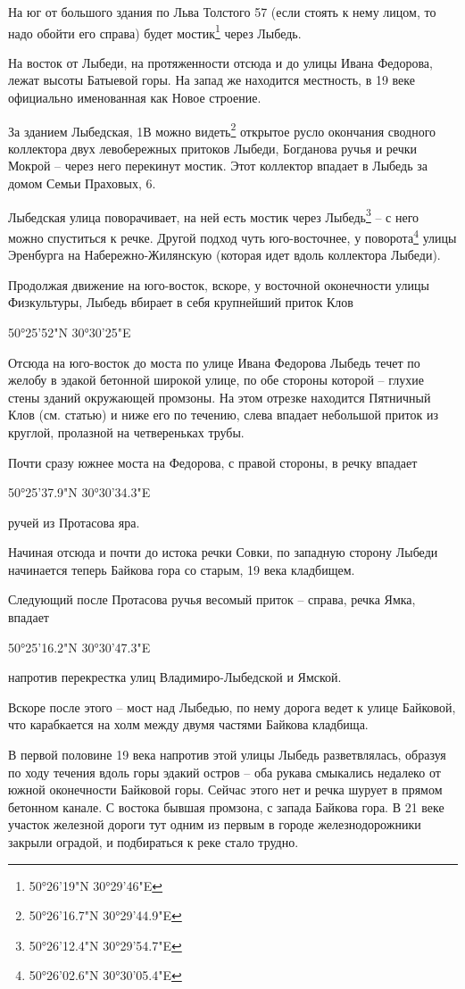 На юг от большого здания по Льва Толстого 57 (если стоять к нему лицом, то надо обойти его справа) будет мостик\footnote{50°26'19"N   30°29'46"E} через Лыбедь.

На восток от Лыбеди, на протяженности отсюда и до улицы Ивана Федорова, лежат высоты Батыевой горы. На запад же находится местность, в 19 веке официально именованная как Новое строение.

За зданием Лыбедская, 1В можно видеть\footnote{50°26'16.7"N 30°29'44.9"E} открытое русло окончания сводного коллектора двух левобережных притоков Лыбеди, Богданова ручья и речки Мокрой – через него перекинут мостик. Этот коллектор впадает в Лыбедь за домом Семьи Праховых, 6.

Лыбедская улица поворачивает, на ней есть мостик через Лыбедь\footnote{50°26'12.4"N 30°29'54.7"E} – с него можно спуститься к речке. Другой подход чуть юго-восто\-чнее, у поворота\footnote{50°26'02.6"N 30°30'05.4"E} улицы Эренбурга на Набе\-режно-Жилянскую (которая идет вдоль коллектора Лыбеди).

Продолжая движение на юго-восток, вскоре, у восточной оконечности улицы Физкультуры, Лыбедь вбирает в себя крупнейший приток Клов

50°25'52"N 30°30'25"E

Отсюда на юго-восток до моста по улице Ивана Федорова Лыбедь течет по желобу в эдакой бетонной широкой улице, по обе стороны которой – глухие стены зданий окружающей промзоны. На этом отрезке находится Пятничный Клов (см. статью) и ниже его по течению, слева впадает небольшой приток из круглой, пролазной на четвереньках трубы.

Почти сразу южнее моста на Федорова, с правой стороны, в речку впадает

50°25'37.9"N 30°30'34.3"E

ручей из Протасова яра.

Начиная отсюда и почти до истока речки Совки, по западную сторону Лыбеди начинается теперь Байкова гора со старым, 19 века кладбищем.

Следующий после Протасова ручья весомый приток – справа, речка Ямка, впадает

50°25'16.2"N 30°30'47.3"E 

напротив перекрестка улиц Владимиро-Лыб\-едской и Ямской.

Вскоре после этого – мост над Лыбедью, по нему дорога ведет к улице Байковой, что карабкается на холм между двумя частями Байкова кладбища.

В первой половине 19 века напротив этой улицы Лыбедь разветвлялась, образуя по ходу течения вдоль горы эдакий остров – оба рукава смыкались недалеко от южной оконечности Байковой горы. Сейчас этого нет и речка шурует в прямом бетонном канале. С востока бывшая промзона, с запада Байкова гора. В 21 веке участок железной дороги тут одним из первым в городе железнодорожники закрыли оградой, и подбираться к реке стало трудно.

